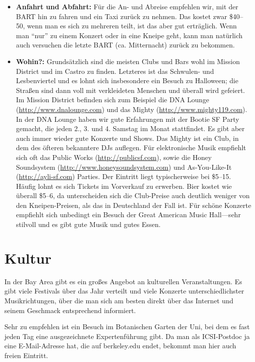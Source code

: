 \documentclass[a4paper]{scrreprt}
\begin{document}
\begin{itemize}

	\item \textbf{Anfahrt und Abfahrt:} Für die An- und Abreise empfehlen wir, mit der BART hin zu fahren und ein Taxi zurück zu nehmen. Das kostet zwar \$40--50, wenn man es sich zu mehreren teilt, ist das aber gut erträglich. Wenn man "`nur"' zu einem Konzert oder in eine Kneipe geht, kann man natürlich auch versuchen die letzte BART (ca. Mitternacht) zurück zu bekommen.

	\item \textbf{Wohin?:} Grundsätzlich sind die meisten Clubs und Bars wohl im Mission District und im Castro zu finden. Letzteres ist das Schwulen- und Lesbenviertel und es lohnt sich insbesondere ein Besuch zu Halloween; die Straßen sind dann voll mit verkleideten Menschen und überall wird gefeiert. Im Mission District befinden sich zum Beispiel die DNA Lounge (\url{http://www.dnalounge.com}) und das Mighty (\url{http://www.mighty119.com}). In der DNA Lounge haben wir gute Erfahrungen mit der Bootie SF Party gemacht, die jeden 2., 3. und 4. Samstag im Monat stattfindet. Es gibt aber auch immer wieder gute Konzerte und Shows. Das Mighty ist ein Club, in dem des öfteren bekanntere DJs auflegen. Für elektronische Musik empfiehlt sich oft das Public Works (\url{http://publicsf.com}), sowie die Honey Soundsystem (\url{http://www.honeysoundsystem.com}) und As-You-Like-It  (\url{http://ayli-sf.com}) Parties. Der Eintritt liegt typischerweise bei \$5--15. Häufig lohnt es sich Tickets im Vorverkauf zu erwerben. Bier kostet wie überall \$5--6, da unterscheiden sich die Club-Preise auch deutlich weniger von den Kneipen-Preisen, als das in Deutschland der Fall ist. Für schöne Konzerte empfiehlt sich unbedingt ein Besuch der Great American Music Hall---sehr stilvoll und es gibt gute Musik und gutes Essen.

\end{itemize}

\section{Kultur}

In der Bay Area gibt es ein großes Angebot an kulturellen Veranstaltungen. Es gibt viele Festivals über das Jahr verteilt und viele Konzerte unterschiedlichster Musikrichtungen, über die man sich am besten direkt über das Internet und seinem Geschmack entsprechend informiert.

Sehr zu empfehlen ist ein Besuch im Botanischen Garten der Uni, bei dem es fast jeden Tag eine ausgezeichnete Expertenführung gibt. Da man als ICSI-Postdoc ja eine E-Mail-Adresse hat, die auf berkeley.edu endet, bekommt man hier auch freien Eintritt.
\end{document}
